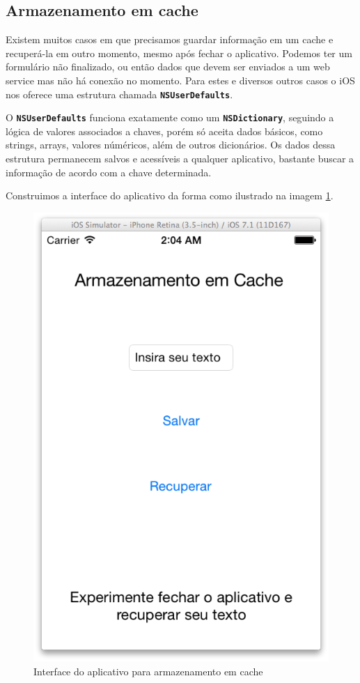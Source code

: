 \documentclass[a4paper,12pt,brazil,doubleside]{book}
\begin{document}
\begin{singlespace}
\bigskip
\bigskip


\section{Armazenamento em cache}


Existem muitos casos em que precisamos guardar informação em um cache e recuperá-la em outro momento, mesmo após fechar o aplicativo. Podemos ter um formulário não finalizado, ou então dados que devem ser enviados a um web service mas não há conexão no momento. Para estes e diversos outros casos o iOS nos oferece uma estrutura chamada \texttt{\textbf{NSUserDefaults}}.

O \texttt{\textbf{NSUserDefaults}} funciona exatamente como um \texttt{\textbf{NSDictionary}}, seguindo a lógica de valores associados a chaves, porém só aceita dados básicos, como strings, arrays, valores núméricos, além de outros dicionários. Os dados dessa estrutura permanecem salvos e acessíveis a qualquer aplicativo, bastante buscar a informação de acordo com a chave determinada.


Construimos a interface do aplicativo da forma como ilustrado na imagem \ref{fig:app_interface_cache}.

\begin{figure}[H]
  \centering
  \includegraphics[width=.55\textwidth]{figuras/4/interface_api_cache.png}
  \caption{Interface do aplicativo para armazenamento em cache}
  \label{fig:app_interface_cache}
\end{figure}



\end{singlespace}
\end{document}
